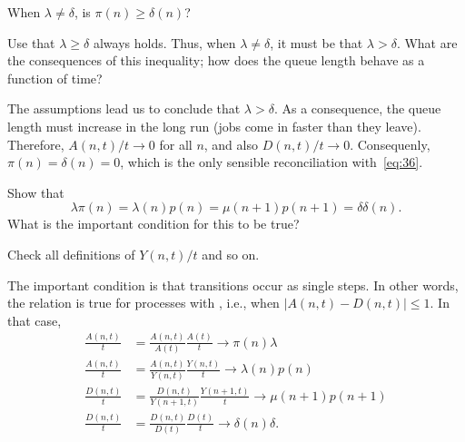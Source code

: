 \begin{exercise}\label{ex:26}
  When $\lambda\neq \delta$, is $\pi(n)\geq \delta(n)$? 
\begin{hint}
    Use that    $\lambda \geq \delta$ always holds. Thus, when $\lambda \neq \delta$, it must be that $\lambda > \delta$. What are the consequences of this inequality; how does the queue length behave as a function of time?
\end{hint}
\begin{solution}
    The assumptions lead us to conclude that $\lambda > \delta$. As a consequence, the queue length must increase in the long run (jobs come in faster than they leave). Therefore, $A(n,t)/t \to 0$ for all $n$, and also $D(n,t)/t\to 0$. Consequenly, $\pi(n) = \delta(n) = 0$, which is the only sensible reconciliation with~\cref{eq:36}. 
\end{solution}
\end{exercise}

\begin{extra}
Show that 
\begin{equation*}
\lambda  \pi(n) = \lambda(n) p(n) = \mu(n+1) p(n+1) = \delta \delta(n).
\end{equation*}
What is the important condition for this to be true?
\begin{hint}
Check all definitions of $Y(n,t)/t$ and so on.
\end{hint}
\begin{solution}
  The important condition is that transitions occur as single
  steps. In other words, the relation is true for processes with
  , i.e., when $|A(n,t) - D(n,t)|\leq 1$.
  In  that case, 
\begin{align*}
  \frac{A(n,t)}{t} &=   \frac{A(n,t)}{A(t)} \frac{A(t)}{t} \to \pi(n) \lambda\\
  \frac{A(n,t)}{t} &=   \frac{A(n,t)}{Y(n,t)} \frac{Y(n,t)}{t} \to \lambda(n)p(n)\\
  \frac{D(n,t)}{t} &=   \frac{D(n,t)}{Y(n+1,t)} \frac{Y(n+1,t)}{t} \to \mu(n+1)p(n+1)\\
  \frac{D(n,t)}{t} &=   \frac{D(n,t)}{D(t)} \frac{D(t)}{t} \to \delta(n)\delta. \\
\end{align*}
\end{solution}
\end{extra}

